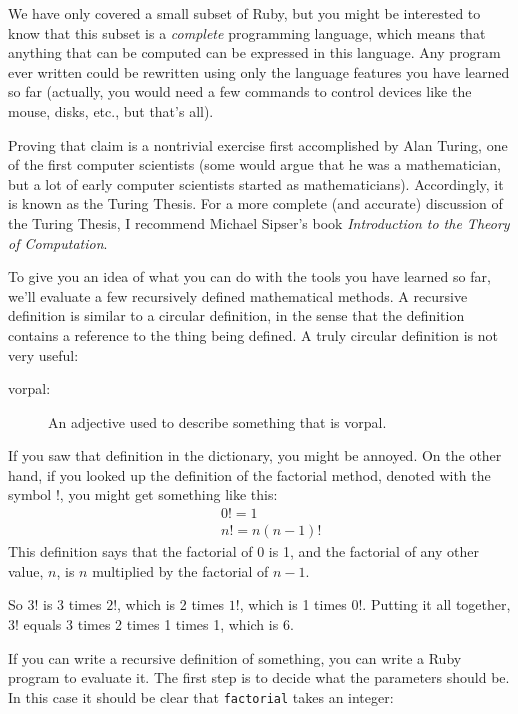 \documentclass[10pt]{book}
\begin{document}
We have only covered a small subset of Ruby, but you might
be interested to know that this subset is a {\em complete}
programming language, which means that anything that can be
computed can be expressed in this language.  Any program ever written
could be rewritten using only the language features you have learned
so far (actually, you would need a few commands to control devices
like the mouse, disks, etc., but that's all).

Proving that claim is a nontrivial exercise first accomplished by Alan
Turing, one of the first computer scientists (some would argue that he
was a mathematician, but a lot of early computer scientists started as
mathematicians).  Accordingly, it is known as the Turing Thesis.
For a more complete (and accurate) discussion of the Turing Thesis,
I recommend Michael Sipser's book {\em Introduction to the
Theory of Computation}.

To give you an idea of what you can do with the tools you have learned
so far, we'll evaluate a few recursively defined mathematical
methods.  A recursive definition is similar to a circular
definition, in the sense that the definition contains a reference to
the thing being defined.  A truly circular definition is not very
useful:

\begin{description}

\item[vorpal:] An adjective used to describe something that is vorpal.

\end{description}

If you saw that definition in the dictionary, you might be annoyed.  On
the other hand, if you looked up the definition of the factorial
method, denoted with the symbol $!$, you might get something like
this:
%
\begin{eqnarray*}
&&  0! = 1 \\
&&  n! = n (n-1)!
\end{eqnarray*}
%
This definition says that the factorial of 0 is 1, and the factorial
of any other value, $n$, is $n$ multiplied by the factorial of $n-1$.

So $3!$ is 3 times $2!$, which is 2 times $1!$, which is 1 times
$0!$. Putting it all together, $3!$ equals 3 times 2 times 1 times 1,
which is 6.

If you can write a recursive definition of something, you can
write a Ruby program to evaluate it.  The first step is to decide
what the parameters should be.  In this case it should be clear
that {\tt factorial} takes an integer:
\end{document}
